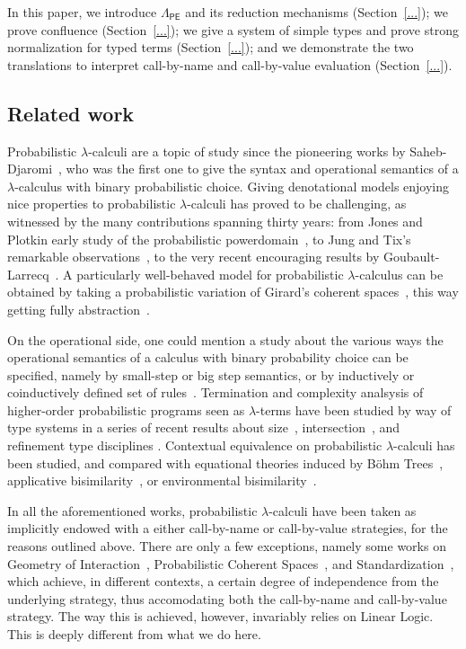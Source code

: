 \documentclass{llncs}
\theoremstyle{definition}
\theoremstyle{plain}
\newcommand\PEL{\Lambda_{\textsf{PE}}}
\newcommand\+[1][{}]{\kern1pt{\smallbin\oplus}_{#1}\kern1pt}
\begin{document}
In this paper, we introduce $\PEL$ and its reduction mechanisms (Section~\ref{...}); we prove confluence (Section~\ref{...}); we give a system of simple types and prove strong normalization for typed terms (Section~\ref{...}); and we demonstrate the two translations to interpret call-by-name and call-by-value evaluation (Section~\ref{...}).


\subsection{Related work}

Probabilistic $\lambda$-calculi are a topic of study since the pioneering works by Saheb-Djaromi~\cite{SahebDjahromi78}, who was the first one to give the syntax and operational semantics of a $\lambda$-calculus with binary probabilistic choice. Giving denotational models enjoying nice properties to probabilistic $\lambda$-calculi has proved to be challenging, as witnessed by the many contributions spanning thirty years: from Jones and Plotkin early study of the probabilistic powerdomain~\cite{JonesPlotkin89}, to Jung and Tix's remarkable observations~\cite{JungTix98}, to the very recent encouraging results by Goubault-Larrecq~\cite{GoubaultLarrecq19}. A particularly well-behaved model for probabilistic $\lambda$-calculus can be obtained by taking a probabilistic variation of Girard's coherent spaces~\cite{DanosEhrhard11}, this way getting fully abstraction~\cite{EPT18}.

On the operational side, one could mention a study about the various ways the operational semantics of a calculus with binary probability choice can be specified, namely by small-step or big step semantics, or by inductively or coinductively defined set of rules~\cite{DalLagoZorzi12}. Termination and complexity analsysis of higher-order probabilistic programs seen as $\lambda$-terms have been studied by way of type systems in a series of recent results about size~\cite{DalLagoGrellois19}, intersection~\cite{BreuvartDalLago18}, and refinement type disciplines \cite{AvanziniDalLagoGhyselen19}. Contextual equivalence on probabilistic $\lambda$-calculi has been studied, and compared with equational theories induced by B\"ohm Trees~\cite{Leventis18}, applicative bisimilarity~\cite{DalLagoSangiorgiAlberti14}, or environmental bisimilarity~\cite{SangiorgiVignudelli16}.

In all the aforementioned works, probabilistic $\lambda$-calculi have been taken as implicitly endowed with a either call-by-name or call-by-value strategies, for the reasons outlined above. There are only a few exceptions, namely some works on Geometry of Interaction~\cite{DLFVY17}, Probabilistic Coherent Spaces~\cite{EhrhardTasson19}, and Standardization~\cite{FaggianRonchi19}, which achieve, in different contexts, a certain degree of independence from the underlying strategy, thus accomodating both the call-by-name and call-by-value strategy. The way this is achieved, however, invariably relies on Linear Logic. This is deeply different from what we do here.
\end{document}
